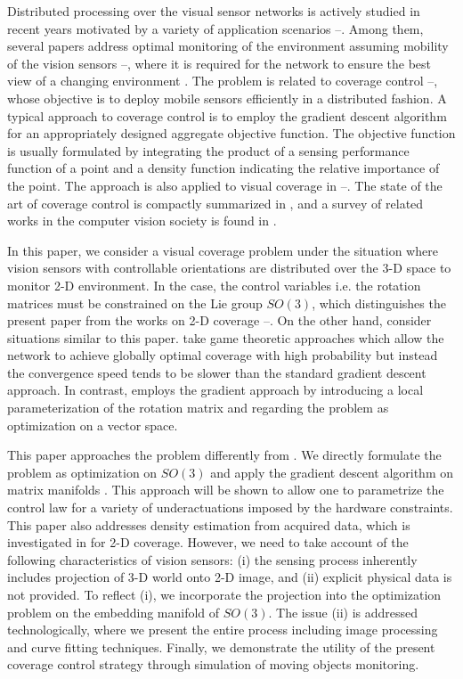 \documentclass[conference,letterpaper]{ieeeconf}
\begin{document}
Distributed processing over the visual sensor networks 
is actively studied in recent years motivated by a variety of
application scenarios \cite{amit2}--\cite{HWF_CDC13}.
Among them, several papers address optimal monitoring of the environment
assuming mobility of the vision sensors
\cite{EYE}--\cite{HWF_CDC13},
where it is required for the network to ensure
the best view of a changing environment \cite{EYE}.
The problem is related to coverage control \cite{CL_EJC05}--\cite{BCM_ES05},
whose objective is to deploy mobile sensors efficiently
in a distributed fashion.
A typical approach to coverage control is to employ
the gradient descent algorithm
for an appropriately designed aggregate objective function.
The objective function is usually formulated by
integrating the product 
of a sensing performance function of a point
and a density function indicating the 
relative importance of the point.
The approach is also applied to visual coverage 
in \cite{EYE}--\cite{GTF_CDC08}.
The state of the art of coverage control is compactly summarized in \cite{EYE},
and a survey of related works in the computer vision society is found in \cite{survey}.



In this paper, we consider a visual coverage problem 
under the situation where vision sensors with controllable 
orientations are distributed over the 3-D space
to monitor 2-D environment.
In the case, the control variables i.e. the rotation matrices
must be constrained on the Lie group $SO(3)$,
which distinguishes the present paper from the works
on 2-D coverage \cite{cortes}--\cite{ZM_SIAM13}.
On the other hand, \cite{EYE,DSMFC_SP12,HWF_CDC13} consider
situations similar to this paper.
\cite{DSMFC_SP12,HWF_CDC13} take game theoretic approaches
which allow the network to achieve globally optimal coverage with
high probability but instead the convergence speed tends
to be slower than the standard gradient descent approach.
In contrast, \cite{EYE} employs the gradient approach
by introducing a local parameterization of
the rotation matrix and regarding the problem as optimization on a vector space.



This paper approaches the problem differently from \cite{EYE}.
We directly formulate the problem as optimization on $SO(3)$
and apply the gradient descent algorithm on matrix manifolds \cite{AMS_BK}.
This approach will be shown to allow one to parametrize the 
control law for a variety of underactuations imposed by the hardware constraints.
This paper also addresses density estimation from acquired data,
which is investigated in \cite{IJRR} for 2-D coverage.
However, we need to take account of the following 
characteristics of vision sensors:
(i) the sensing process inherently includes
projection of 3-D world onto 2-D image, and
(ii) explicit physical data is not provided.
To reflect (i), we incorporate the projection into the 
optimization problem on the embedding manifold of $SO(3)$.
The issue (ii) is addressed technologically, where 
we present the entire process including image processing 
and curve fitting techniques.
Finally, we demonstrate the utility of the present coverage 
control strategy through simulation of moving objects monitoring.
\end{document}
